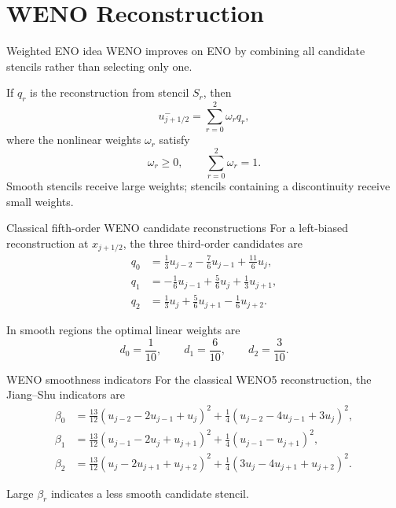 \documentclass[aspectratio=169]{beamer}
\begin{document}
\section{WENO Reconstruction}

\begin{frame}{Weighted ENO idea}
WENO improves on ENO by combining all candidate stencils rather than selecting only one.

\medskip
If $q_r$ is the reconstruction from stencil $S_r$, then
\begin{equation}
    u^-_{j+1/2}
    =\sum_{r=0}^{2}\omega_r q_r,
\end{equation}
where the nonlinear weights $\omega_r$ satisfy
\[
    \omega_r\ge 0,
    \qquad
    \sum_{r=0}^{2}\omega_r=1.
\]
Smooth stencils receive large weights; stencils containing a discontinuity receive small weights.
\end{frame}

\begin{frame}{Classical fifth-order WENO candidate reconstructions}
For a left-biased reconstruction at $x_{j+1/2}$, the three third-order candidates are
\begin{align*}
q_0 &= \frac{1}{3}u_{j-2}-\frac{7}{6}u_{j-1}+\frac{11}{6}u_j,\\
q_1 &= -\frac{1}{6}u_{j-1}+\frac{5}{6}u_j+\frac{1}{3}u_{j+1},\\
q_2 &= \frac{1}{3}u_j+\frac{5}{6}u_{j+1}-\frac{1}{6}u_{j+2}.
\end{align*}

In smooth regions the optimal linear weights are
\begin{equation}
    d_0=\frac{1}{10},
    \qquad
    d_1=\frac{6}{10},
    \qquad
    d_2=\frac{3}{10}.
\end{equation}
\end{frame}

\begin{frame}{WENO smoothness indicators}
For the classical WENO5 reconstruction, the Jiang--Shu indicators are
\begin{align*}
\beta_0 & = \frac{13}{12}(u_{j-2}-2u_{j-1}+u_j)^2
+\frac14(u_{j-2}-4u_{j-1}+3u_j)^2,\\
\beta_1 & = \frac{13}{12}(u_{j-1}-2u_j+u_{j+1})^2
+\frac14(u_{j-1}-u_{j+1})^2,\\
\beta_2 & = \frac{13}{12}(u_j-2u_{j+1}+u_{j+2})^2
+\frac14(3u_j-4u_{j+1}+u_{j+2})^2.
\end{align*}

Large $\beta_r$ indicates a less smooth candidate stencil.
\end{frame}
\end{document}
